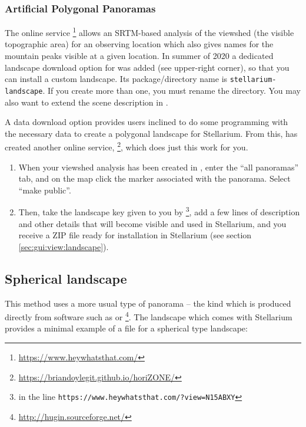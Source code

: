 \subsubsection{Artificial Polygonal Panoramas}
The online service
\footnote{\url{https://www.heywhatsthat.com/}}
allows an SRTM-based analysis of the viewshed (the visible topographic
area) for an observing location which also gives names for the
mountain peaks visible at a given location. In summer of 2020 a
dedicated landscape download option for  was added
(see upper-right corner), so that you can install a custom
landscape. Its package/directory name is
\texttt{stellarium-landscape}. If you create more than one, you must
rename the directory. You may also want to extend the scene
description in .

A data download option provides users inclined to do some programming
with the necessary data to create a polygonal landscape for
Stellarium. From this,  has created another online service,
\footnote{\url{https://briandoylegit.github.io/horiZONE/}},
which does just this work for you.
\begin{enumerate}
\item When your viewshed analysis has been created in
  , enter the ``all panoramas'' tab, and on the
  map click the marker associated with the panorama. Select ``make
  public''.
\item Then, take the landscape key given to you by
  \footnote{ in the line
    \texttt{https://www.heywhatsthat.com/?view=N15ABXY}}, add a few
  lines of description and other details that will become visible and
  used in Stellarium, and you receive a ZIP file ready for
  installation in Stellarium (see section
  \ref{sec:gui:view:landscape}).
\end{enumerate}


\subsection{Spherical landscape}
\label{sec:landscapes:Spherical}

This method uses a more usual type of panorama -- the kind which is
produced directly from software such as  or
\footnote{\url{http://hugin.sourceforge.net/}}.  The
 landscape which comes with Stellarium provides a
minimal example of a  file for a spherical type
landscape:

